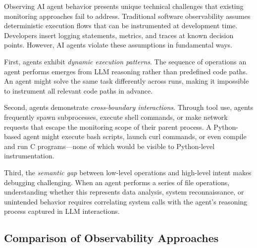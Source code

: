 \documentclass[sigplan,screen，review,9pt]{acmart}
\begin{document}
Observing AI agent behavior presents unique technical challenges that existing monitoring approaches fail to address. Traditional software observability assumes deterministic execution flows that can be instrumented at development time. Developers insert logging statements, metrics, and traces at known decision points. However, AI agents violate these assumptions in fundamental ways.

First, agents exhibit \emph{dynamic execution patterns}. The sequence of operations an agent performs emerges from LLM reasoning rather than predefined code paths. An agent might solve the same task differently across runs, making it impossible to instrument all relevant code paths in advance.

Second, agents demonstrate \emph{cross-boundary interactions}. Through tool use, agents frequently spawn subprocesses, execute shell commands, or make network requests that escape the monitoring scope of their parent process. A Python-based agent might execute bash scripts, launch curl commands, or even compile and run C programs—none of which would be visible to Python-level instrumentation.

Third, the \emph{semantic gap} between low-level operations and high-level intent makes debugging challenging. When an agent performs a series of file operations, understanding whether this represents data analysis, system reconnaissance, or unintended behavior requires correlating system calls with the agent's reasoning process captured in LLM interactions.

\subsection{Comparison of Observability Approaches}
\end{document}
